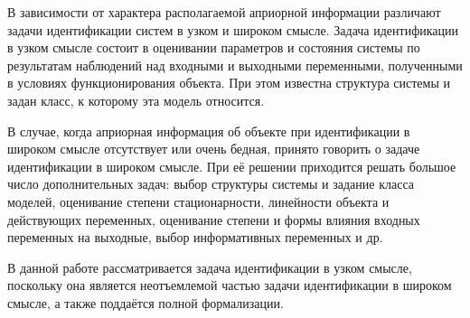 


В зависимости от характера располагаемой априорной информации различают
задачи идентификации систем в узком и широком смысле.
Задача идентификации в узком смысле состоит в оценивании параметров и
состояния системы по результатам наблюдений над входными и выходными переменными,
полученными в условиях функционирования объекта.
При этом известна структура системы и задан класс, к которому эта модель относится.

В случае, когда априорная информация об объекте при идентификации в широком смысле отсутствует
или очень бедная, принято говорить о задаче идентификации в широком смысле.
При её решении приходится решать большое число дополнительных задач:
выбор структуры системы и задание класса моделей,
оценивание степени стационарности, линейности объекта и действующих переменных,
оценивание степени и формы влияния входных переменных на выходные,
выбор информативных переменных и др.

{\color{red}
  В данной работе рассматривается задача идентификации в узком смысле,
  поскольку она является неотъемлемой частью задачи идентификации в широком смысле,
  а также поддаётся полной формализации.
}



